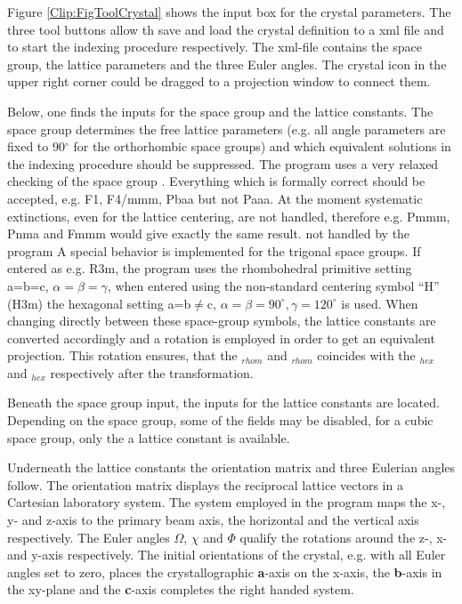Figure \ref{Clip:FigToolCrystal} shows the input box for the crystal
parameters. The three tool buttons allow th save and load the crystal
definition to a xml file and to start the indexing procedure
respectively. The xml-file contains the space group, the lattice
parameters and the three Euler angles. The crystal icon in the upper
right corner could be dragged to a projection window to connect them.

Below, one finds the inputs for the space group and the lattice
constants. The space group determines the free lattice parameters
(e.g. all angle parameters are fixed to 90$^\circ$ for the
orthorhombic space groups) and which equivalent solutions in the
indexing procedure should be suppressed. The program uses a very
relaxed checking of the space group . Everything which is formally correct
should be accepted, e.g. F1, F4/mmm, Pbaa but not Paaa. At the moment
systematic extinctions, even for the lattice centering, are not
handled, therefore e.g. Pmmm, Pnma and Fmmm would give exactly the
same result.  not handled by the program A special behavior is
implemented for the trigonal space groups. If entered as e.g. R3m, the
program uses the rhombohedral primitive setting a=b=c,
$\alpha=\beta=\gamma$, when entered using the non-standard centering
symbol ``H'' (H3m) the hexagonal setting a=b$\ne$c,
$\alpha=\beta=90^\circ, \gamma=120^\circ$ is used. When changing
directly between these space-group symbols, the lattice constants are
converted accordingly and a rotation is employed in order to get an
equivalent projection. This rotation ensures, that the
\hkl[111]$_{rhom}$ and \hkl[1 -1 0]$_{rhom}$ coincides with the
\hkl[001]$_{hex}$ and \hkl[100]$_{hex}$ respectively after the
transformation.

Beneath the space group input, the inputs for the lattice constants
are located. Depending on the space group, some of the fields may be
disabled, for a cubic space group, only the a lattice constant is
available.

Underneath the lattice constants the orientation matrix and three
Eulerian angles follow. The orientation matrix displays the reciprocal
lattice vectors in a Cartesian laboratory system. The system employed
in the program maps the x-, y- and z-axis to the primary beam axis,
the horizontal and the vertical axis respectively. The Euler angles
$\Omega$, $\chi$ and $\Phi$ qualify the rotations around the z-, x-
and y-axis respectively. The initial orientations of the crystal,
e.g. with all Euler angles set to zero, places the crystallographic
\textbf{a}-axis on the x-axis, the \textbf{b}-axis in the xy-plane and
the \textbf{c}-axis completes the right handed system.


